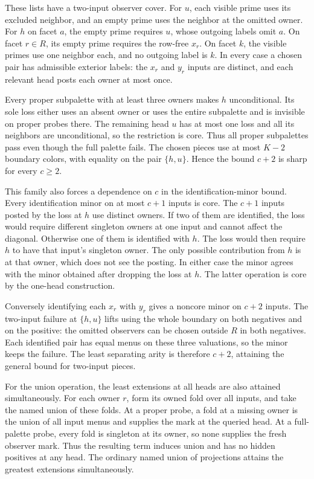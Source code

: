 These lists have a two-input observer cover.
For $u$, each visible prime uses its
excluded neighbor, and an empty prime
uses the neighbor at the omitted owner.
For $h$ on facet $a$, the empty prime
requires $u$, whose outgoing labels
omit $a$. On facet $r\in R$, its empty
prime requires the row-free $x_r$.
On facet $k$, the visible primes use
one neighbor each, and no outgoing
label is $k$. In every case a chosen
pair has admissible exterior labels:
the $x_r$ and $y_r$ inputs are distinct,
and each relevant head posts each
owner at most once.

Every proper subpalette with at least
three owners makes $h$ unconditional.
Its sole loss either uses an absent
owner or uses the entire subpalette
and is invisible on proper probes
there. The remaining head $u$ has
at most one loss and all its neighbors
are unconditional, so the restriction
is core. Thus all proper subpalettes
pass even though the full palette
fails. The chosen pieces use at most $K-2$
boundary colors, with equality on the pair
$\{h,u\}$. Hence the bound $c+2$ is sharp
for every $c\ge2$.

This family also forces a dependence on
$c$ in the identification-minor bound.
Every identification minor on at most $c+1$
inputs is core. The $c+1$ inputs posted
by the loss at $h$ use distinct owners.
If two of them are identified, the loss
would require different singleton owners
at one input and cannot affect the diagonal.
Otherwise one of them is identified with $h$.
The loss would then require $h$ to have
that input's singleton owner. The only
possible contribution from $h$ is at that
owner, which does not see the posting.
In either case the minor agrees with the
minor obtained after dropping the loss
at $h$. The latter operation is core by
the one-head construction.

Conversely identifying each $x_r$ with
$y_r$ gives a noncore minor on $c+2$
inputs. The two-input failure at
$\{h,u\}$ lifts using the whole boundary
on both negatives and on the positive:
the omitted observers can be chosen
outside $R$ in both negatives. Each
identified pair has equal menus on
these three valuations, so the minor
keeps the failure. The least separating
arity is therefore $c+2$, attaining the
general bound for two-input pieces.

For the union operation, the least extensions at
all heads are also attained simultaneously. For
each owner $r$, form its owned fold over all
inputs, and take the named union of these folds.
At a proper probe, a fold at a missing owner
is the union of all input menus and supplies
the mark at the queried head. At a full-palette
probe, every fold is singleton at its owner,
so none supplies the fresh observer mark.
Thus the resulting term induces union and
has no hidden positives at any head. The
ordinary named union of projections attains
the greatest extensions simultaneously.

